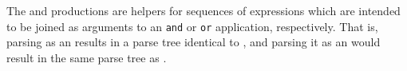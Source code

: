\documentclass[12pt]{article}
\renewcommand{\call}[1]{\texttt{#1}} %
\begin{document}
The  and  productions are
helpers for sequences of expressions which are intended to be joined
as arguments to an \call{and} or \call{or} application, respectively.
That is, parsing  as an 
results in a parse tree identical to ,
and parsing it as an  would result in the same
parse tree as .
\end{document}
